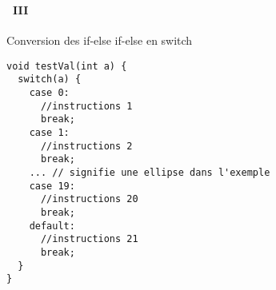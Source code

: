 \begin{frame}[containsverbatim]
  \frametitle{\secname}
  \framesubtitle{\subsecname~III}

  {\footnotesize\begin{exampleblock}{Conversion des if-else if-else en switch}
    \begin{verbatim}
void testVal(int a) {
  switch(a) {
    case 0:
      //instructions 1
      break;
    case 1:
      //instructions 2
      break;
    ... // signifie une ellipse dans l'exemple
    case 19:
      //instructions 20
      break;
    default:
      //instructions 21
      break;
  }
}\end{verbatim}
  \end{exampleblock}}
\end{frame}


